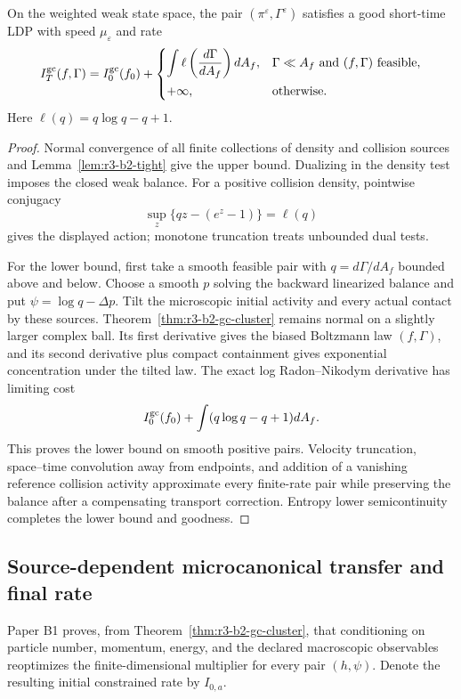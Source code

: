 \begin{theorem}
\label{thm:r3-b2-gc-ldp}
On the weighted weak state space, the pair
\((\pi^\varepsilon,\Gamma^\varepsilon)\) satisfies a good short-time LDP with
speed \(\mu_\varepsilon\) and rate
\[
 I_T^{\rm gc}(f,\Gamma)
 =I_0^{\rm gc}(f_0)
 +\begin{cases}
 \displaystyle\int
 \ell\left(\frac{d\Gamma}{dA_f}\right)dA_f,
 &\Gamma\ll A_f\text{ and }(f,\Gamma)\text{ feasible},\\[2ex]
 +\infty,&\text{otherwise}.
 \end{cases}
\]
Here \(\ell(q)=q\log q-q+1\).
\end{theorem}

\begin{proof}
Normal convergence of all finite collections of density and collision sources
and Lemma~\ref{lem:r3-b2-tight} give the upper bound.  Dualizing in the density
test imposes the closed weak balance.  For a positive collision density,
pointwise conjugacy
\[
 \sup_z\{qz-(e^z-1)\}=\ell(q)
\]
gives the displayed action; monotone truncation treats unbounded dual tests.

For the lower bound, first take a smooth feasible pair with
\(q=d\Gamma/dA_f\) bounded above and below.  Choose a smooth \(p\) solving the
backward linearized balance and put
\(\psi=\log q-\Delta p\).  Tilt the microscopic initial activity and every
actual contact by these sources.  Theorem~\ref{thm:r3-b2-gc-cluster} remains
normal on a slightly larger complex ball.  Its first derivative gives the
biased Boltzmann law \((f,\Gamma)\), and its second derivative plus compact
containment gives exponential concentration under the tilted law.  The exact
log Radon--Nikodym derivative has limiting cost
\[
 I_0^{\rm gc}(f_0)+\int(q\log q-q+1)dA_f.
\]
This proves the lower bound on smooth positive pairs.  Velocity truncation,
space--time convolution away from endpoints, and addition of a vanishing
reference collision activity approximate every finite-rate pair while
preserving the balance after a compensating transport correction.  Entropy
lower semicontinuity completes the lower bound and goodness.
\end{proof}

\subsection{Source-dependent microcanonical transfer and final rate}

Paper B1 proves, from Theorem~\ref{thm:r3-b2-gc-cluster}, that conditioning on
particle number, momentum, energy, and the declared macroscopic observables
reoptimizes the finite-dimensional multiplier for every pair \((h,\psi)\).
Denote the resulting initial constrained rate by \(I_{0,a}\).

